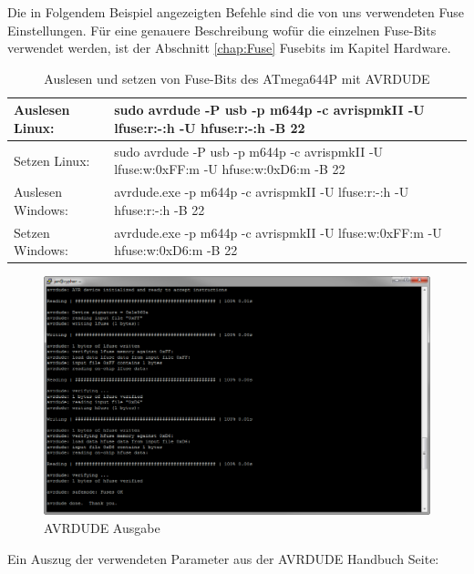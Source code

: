 Die in Folgendem Beispiel angezeigten Befehle sind die von uns verwendeten Fuse
Einstellungen. Für eine genauere Beschreibung wofür die einzelnen Fuse-Bits
verwendet werden, ist der Abschnitt \ref{chap:Fuse} Fusebits im Kapitel 
Hardware.

\begin{table}[H]
\begin{tabular}{| p{} | p{} |}
\hline
Auslesen Linux:& sudo avrdude -P usb -p m644p -c avrispmkII  -U lfuse:r:-:h -U hfuse:r:-:h -B 22 \\ \hline
Setzen Linux:& sudo avrdude -P usb -p m644p -c avrispmkII -U lfuse:w:0xFF:m -U hfuse:w:0xD6:m -B 22 \\ \hline
Auslesen Windows:& avrdude.exe -p m644p -c avrispmkII -U lfuse:r:-:h -U hfuse:r:-:h -B 22 \\ \hline 
Setzen Windows:& avrdude.exe -p m644p -c avrispmkII -U lfuse:w:0xFF:m -U hfuse:w:0xD6:m -B 22 \\ \hline
\end{tabular}
\caption{Auslesen und setzen von Fuse-Bits des ATmega644P mit AVRDUDE}
\label{ParameterAvrdude1}
\end{table}

\begin{figure}[h]
\centering
\includegraphics[width=13cm]{content/pictures/Anleitung/neuerProzessor/avrOutput.png}
\caption{AVRDUDE Ausgabe}
\end{figure}

Ein Auszug der verwendeten Parameter aus der AVRDUDE Handbuch Seite:

